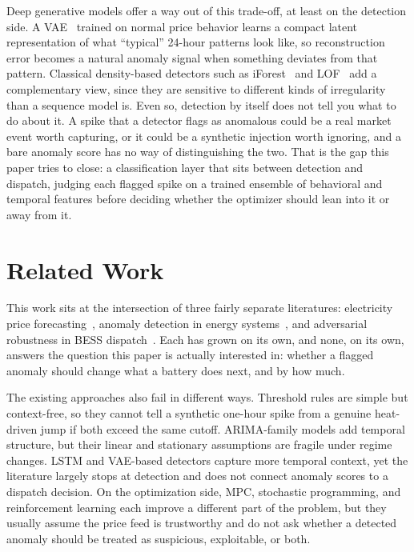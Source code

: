 \documentclass[journal]{IEEEtran}
\begin{document}
Deep generative models offer a way out of this trade-off, at least on the detection side. A VAE~\cite{VAE} trained on normal price behavior learns a compact latent representation of what ``typical'' 24-hour patterns look like, so reconstruction error becomes a natural anomaly signal when something deviates from that pattern. Classical density-based detectors such as iForest~\cite{IForest} and LOF~\cite{LOF} add a complementary view, since they are sensitive to different kinds of irregularity than a sequence model is. Even so, detection by itself does not tell you what to do about it. A spike that a detector flags as anomalous could be a real market event worth capturing, or it could be a synthetic injection worth ignoring, and a bare anomaly score has no way of distinguishing the two. That is the gap this paper tries to close: a classification layer that sits between detection and dispatch, judging each flagged spike on a trained ensemble of behavioral and temporal features before deciding whether the optimizer should lean into it or away from it.

\section{Related Work}

This work sits at the intersection of three fairly separate literatures: electricity price forecasting~\cite{Price_Forecasting}, anomaly detection in energy systems~\cite{AE_Anomaly}, and adversarial robustness in BESS dispatch~\cite{BESS}. Each has grown on its own, and none, on its own, answers the question this paper is actually interested in: whether a flagged anomaly should change what a battery does next, and by how much.

The existing approaches also fail in different ways. Threshold rules are simple but context-free, so they cannot tell a synthetic one-hour spike from a genuine heat-driven jump if both exceed the same cutoff. ARIMA-family models add temporal structure, but their linear and stationary assumptions are fragile under regime changes. LSTM and VAE-based detectors capture more temporal context, yet the literature largely stops at detection and does not connect anomaly scores to a dispatch decision. On the optimization side, MPC, stochastic programming, and reinforcement learning each improve a different part of the problem, but they usually assume the price feed is trustworthy and do not ask whether a detected anomaly should be treated as suspicious, exploitable, or both.
\end{document}
